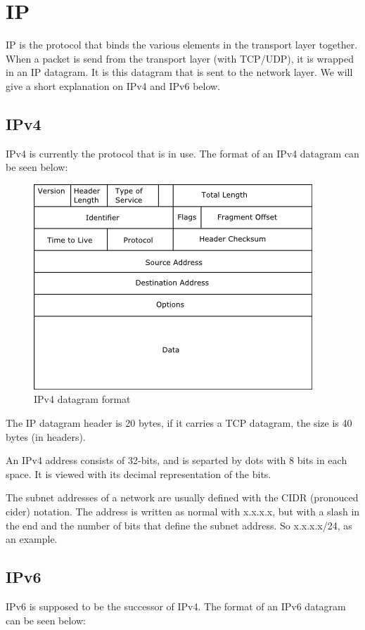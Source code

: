 \section{IP}
IP is the protocol that binds the various elements in the transport
layer together. When a packet is send from the transport layer (with
TCP/UDP), it is wrapped in an IP datagram. It is this datagram that is
sent to the network layer. We will give a short explanation on IPv4
and IPv6 below.

\subsection{IPv4}
IPv4 is currently the protocol that is in use. The format of an IPv4
datagram can be seen below:

\begin{figure}
  \begin{center}
    \includegraphics[scale=1]{IPv4dg.png}
  \end{center}
  \caption{IPv4 datagram format}
\end{figure}

The IP datagram header is 20 bytes, if it carries a TCP datagram, the
size is 40 bytes (in headers).

An IPv4 address consists of 32-bits, and is separted by dots with 8
bits in each space. It is viewed with its decimal representation of
the bits.

The subnet addresses of a network are usually defined with the CIDR
(pronouced cider) notation. The address is written as normal with
x.x.x.x, but with a slash in the end and the number of bits that
define the subnet address. So x.x.x.x/24, as an example.

\subsection{IPv6}
IPv6 is supposed to be the successor of IPv4. The format of an IPv6
datagram can be seen below:

